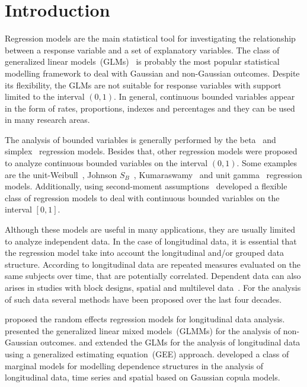 \documentclass[a4paper,12pt]{article}
\begin{document}
\section{Introduction}

Regression models are the main statistical tool for investigating the
relationship between a response variable and a set of explanatory
variables. The class of generalized linear models~(GLMs)~\citep{GLM72}
is probably the most popular statistical modelling framework to deal
with Gaussian and non-Gaussian outcomes. Despite its flexibility, the
GLMs are not suitable for response variables with support limited to the
interval \((0, 1)\). In general, continuous bounded variables appear in
the form of rates, proportions, indexes and percentages and they can be
used in many research areas.

The analysis of bounded variables is generally performed by the
beta~\citep{} and simplex~\citep{} regression models. Besides that,
other regression models were proposed to analyze continuous bounded
variables on the interval \((0, 1)\). Some examples are the
unit-Weibull~\citep{}, Johnson \(S_{B}\)~\citep{}, Kumaraswamy~\citep{}
and unit gamma~\citep{} regression models. Additionally, using
second-moment assumptions~\cite{} developed a flexible class of
regression models to deal with continuous bounded variables on the
interval \([0, 1]\).

Although these models are useful in many applications, they are usually
limited to analyze independent data. In the case of longitudinal data,
it is essential that the regression model take into account the
longitudinal and/or grouped data structure. According to \cite{}
longitudinal data are repeated measures evaluated on the same subjects
over time, that are potentially correlated. Dependent data can also
arises in studies with block designs, spatial and multilevel
data~\citep{}. For the analysis of such data several methods have been
proposed over the last four decades.

\cite{} proposed the random effects regression models for longitudinal
data analysis. \cite{} presented the generalized linear mixed
models~(GLMMs) for the analysis of non-Gaussian outcomes. \cite{} and
\cite{} extended the GLMs for the analysis of longitudinal data using a
generalized estimating equation~(GEE) approach. \cite{gcmr} developed a
class of marginal models for modelling dependence structures in the
analysis of longitudinal data, time series and spatial based on Gaussian
copula models.
\end{document}
